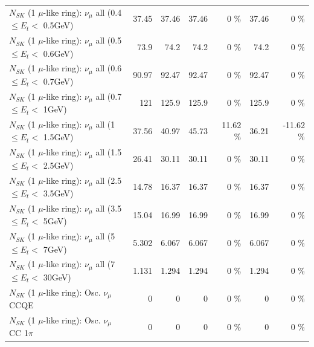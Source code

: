 \begin{table}
\begin{tabular}{| l | r | r | r  r | r  r |}
       $N_{SK}$ (1 $\mu$-like ring): $\nu_{\mu}$ all (0.4 $\leq E_{t} <$ 0.5GeV) &           37.45 &           37.46 &           37.46 &        0 \%  &           37.46 &        0 \%  \\ 
       $N_{SK}$ (1 $\mu$-like ring): $\nu_{\mu}$ all (0.5 $\leq E_{t} <$ 0.6GeV) &            73.9 &            74.2 &            74.2 &        0 \%  &            74.2 &        0 \%  \\ 
       $N_{SK}$ (1 $\mu$-like ring): $\nu_{\mu}$ all (0.6 $\leq E_{t} <$ 0.7GeV) &           90.97 &           92.47 &           92.47 &        0 \%  &           92.47 &        0 \%  \\ 
         $N_{SK}$ (1 $\mu$-like ring): $\nu_{\mu}$ all (0.7 $\leq E_{t} <$ 1GeV) &             121 &           125.9 &           125.9 &        0 \%  &           125.9 &        0 \%  \\ 
         $N_{SK}$ (1 $\mu$-like ring): $\nu_{\mu}$ all (1 $\leq E_{t} <$ 1.5GeV) &           37.56 &           40.97 &           45.73 &    11.62 \%  &           36.21 &   -11.62 \%  \\ 
       $N_{SK}$ (1 $\mu$-like ring): $\nu_{\mu}$ all (1.5 $\leq E_{t} <$ 2.5GeV) &           26.41 &           30.11 &           30.11 &        0 \%  &           30.11 &        0 \%  \\ 
       $N_{SK}$ (1 $\mu$-like ring): $\nu_{\mu}$ all (2.5 $\leq E_{t} <$ 3.5GeV) &           14.78 &           16.37 &           16.37 &        0 \%  &           16.37 &        0 \%  \\ 
         $N_{SK}$ (1 $\mu$-like ring): $\nu_{\mu}$ all (3.5 $\leq E_{t} <$ 5GeV) &           15.04 &           16.99 &           16.99 &        0 \%  &           16.99 &        0 \%  \\ 
           $N_{SK}$ (1 $\mu$-like ring): $\nu_{\mu}$ all (5 $\leq E_{t} <$ 7GeV) &           5.302 &           6.067 &           6.067 &        0 \%  &           6.067 &        0 \%  \\ 
          $N_{SK}$ (1 $\mu$-like ring): $\nu_{\mu}$ all (7 $\leq E_{t} <$ 30GeV) &           1.131 &           1.294 &           1.294 &        0 \%  &           1.294 &        0 \%  \\ 
\hline
\hline
                               $N_{SK}$ (1 $\mu$-like ring): Osc. $\nu_\mu$ CCQE &               0 &               0 &               0 &        0 \%  &               0 &        0 \%  \\ 
                          $N_{SK}$ (1 $\mu$-like ring): Osc. $\nu_\mu$ CC 1$\pi$ &               0 &               0 &               0 &        0 \%  &               0 &        0 \%  \\ 

\end{tabular}
\end{table}
